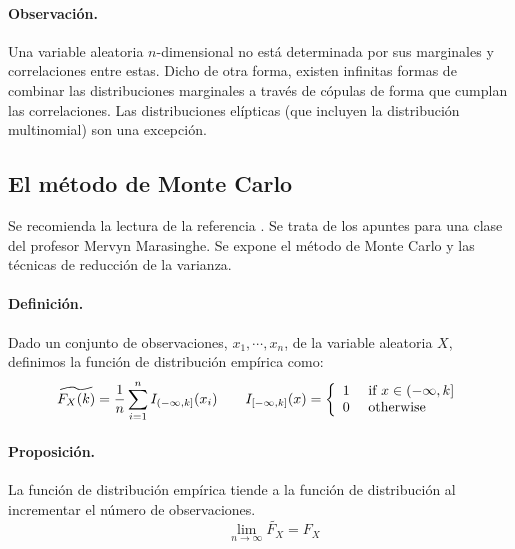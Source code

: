 \paragraph{Observaci\'on.} Una variable aleatoria $n$-dimensional no est\'a 
determinada por sus marginales y correlaciones entre estas. Dicho de otra
forma, existen infinitas formas de combinar las distribuciones marginales
 a través de c\'opulas de forma que cumplan las correlaciones. Las distribuciones 
el\'ipticas (que incluyen la distribuci\'on multinomial) son una excepci\'on. 


\subsection{El m\'etodo de Monte Carlo}

Se recomienda la lectura de la referencia \cite{mc:mervyn}. Se trata de los 
apuntes para una clase del profesor Mervyn Marasinghe. Se expone el m\'etodo 
de Monte Carlo y las t\'ecnicas de reducci\'on de la varianza.

\paragraph{Definici\'on.} Dado un conjunto de observaciones, $x_1, \cdots, x_n$,
de la variable aleatoria $X$, definimos la funci\'on de distribuci\'on emp\'irica 
como:
\begin{displaymath}
\widetilde{F_X(k)} = \frac{1}{n} \sum_{i=1}^{n} I_{(-\infty,k]}(x_i) \qquad
I_{[-\infty,k]}(x) = \left\{
\begin{array}{ll}
1 & \textrm{ if } x \in (-\infty,k] \cr
0 & \textrm{ otherwise}
\end{array}
\right.
\end{displaymath}

\paragraph{Proposici\'on.} La funci\'on de distribuci\'on emp\'irica tiende a 
la funci\'on de distribuci\'on al incrementar el n\'umero de observaciones.
\begin{displaymath}
\qquad \lim_{n\to\infty} \widetilde{F_X} = F_X
\end{displaymath}

